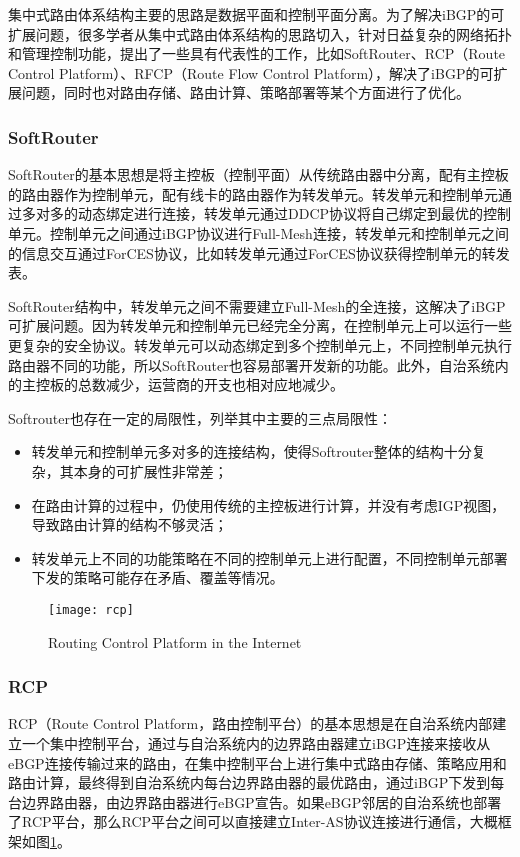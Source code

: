 集中式路由体系结构主要的思路是数据平面和控制平面分离。为了解决iBGP的可扩展问题，很多学者从集中式路由体系结构的思路切入，针对日益复杂的网络拓扑和管理控制功能，提出了一些具有代表性的工作，比如SoftRouter、RCP（Route Control Platform）、RFCP（Route Flow Control Platform），解决了iBGP的可扩展问题，同时也对路由存储、路由计算、策略部署等某个方面进行了优化。

\subsubsection{SoftRouter\cite{lakshman2004}}
SoftRouter的基本思想是将主控板（控制平面）从传统路由器中分离，配有主控板的路由器作为控制单元，配有线卡的路由器作为转发单元。转发单元和控制单元通过多对多的动态绑定进行连接，转发单元通过DDCP协议将自己绑定到最优的控制单元。控制单元之间通过iBGP协议进行Full-Mesh连接，转发单元和控制单元之间的信息交互通过ForCES\cite{rfc3746}协议，比如转发单元通过ForCES协议获得控制单元的转发表。

SoftRouter结构中，转发单元之间不需要建立Full-Mesh的全连接，这解决了iBGP可扩展问题。因为转发单元和控制单元已经完全分离，在控制单元上可以运行一些更复杂的安全协议。转发单元可以动态绑定到多个控制单元上，不同控制单元执行路由器不同的功能，所以SoftRouter也容易部署开发新的功能。此外，自治系统内的主控板的总数减少，运营商的开支也相对应地减少。

Softrouter也存在一定的局限性，列举其中主要的三点局限性：
\begin{itemize}
  \item 转发单元和控制单元多对多的连接结构，使得Softrouter整体的结构十分复杂，其本身的可扩展性非常差；
  \item 在路由计算的过程中，仍使用传统的主控板进行计算，并没有考虑IGP视图，导致路由计算的结构不够灵活；
  \item 转发单元上不同的功能策略在不同的控制单元上进行配置，不同控制单元部署下发的策略可能存在矛盾、覆盖等情况。
\end{itemize}

\begin{figure}
  \centering
  \texttt{[image: rcp]}
  \caption{Routing Control Platform in the Internet\cite{Feamster2004The}}
  \label{fig:rcp}
\end{figure}

\subsubsection{RCP\cite{Feamster2004The}}
RCP（Route Control Platform，路由控制平台）的基本思想是在自治系统内部建立一个集中控制平台，通过与自治系统内的边界路由器建立iBGP连接来接收从eBGP连接传输过来的路由，在集中控制平台上进行集中式路由存储、策略应用和路由计算，最终得到自治系统内每台边界路由器的最优路由，通过iBGP下发到每台边界路由器，由边界路由器进行eBGP宣告。如果eBGP邻居的自治系统也部署了RCP平台，那么RCP平台之间可以直接建立Inter-AS协议连接进行通信，大概框架如图\ref{fig:rcp}。


